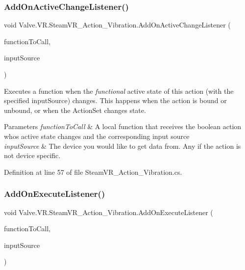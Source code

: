 \subsubsection{\texorpdfstring{AddOnActiveChangeListener()}{AddOnActiveChangeListener()}}
{\footnotesize\ttfamily void Valve.\+V\+R.\+Steam\+V\+R\+\_\+\+Action\+\_\+\+Vibration.\+Add\+On\+Active\+Change\+Listener (\begin{DoxyParamCaption}\item[{\mbox{\hyperlink{class_valve_1_1_v_r_1_1_steam_v_r___action___vibration_a7706b3c9b71de3bea16a3fab8a882f0b}{Active\+Change\+Handler}}}]{function\+To\+Call,  }\item[{\mbox{\hyperlink{namespace_valve_1_1_v_r_a82e5bf501cc3aa155444ee3f0662853f}{Steam\+V\+R\+\_\+\+Input\+\_\+\+Sources}}}]{input\+Source }\end{DoxyParamCaption})}



Executes a function when the {\itshape functional} active state of this action (with the specified input\+Source) changes. This happens when the action is bound or unbound, or when the Action\+Set changes state. 


\begin{DoxyParams}{Parameters}
{\em function\+To\+Call} & A local function that receives the boolean action who\textquotesingle{}s active state changes and the corresponding input source\\
\hline
{\em input\+Source} & The device you would like to get data from. Any if the action is not device specific.\\
\hline
\end{DoxyParams}


Definition at line 57 of file Steam\+V\+R\+\_\+\+Action\+\_\+\+Vibration.\+cs.

\mbox{\label{class_valve_1_1_v_r_1_1_steam_v_r___action___vibration_a9500575c412d448cd6f142429627b995}} 
\subsubsection{\texorpdfstring{AddOnExecuteListener()}{AddOnExecuteListener()}}
{\footnotesize\ttfamily void Valve.\+V\+R.\+Steam\+V\+R\+\_\+\+Action\+\_\+\+Vibration.\+Add\+On\+Execute\+Listener (\begin{DoxyParamCaption}\item[{\mbox{\hyperlink{class_valve_1_1_v_r_1_1_steam_v_r___action___vibration_ac075e9e8f3e9eea89be32c403e6f86d5}{Execute\+Handler}}}]{function\+To\+Call,  }\item[{\mbox{\hyperlink{namespace_valve_1_1_v_r_a82e5bf501cc3aa155444ee3f0662853f}{Steam\+V\+R\+\_\+\+Input\+\_\+\+Sources}}}]{input\+Source }\end{DoxyParamCaption})}



